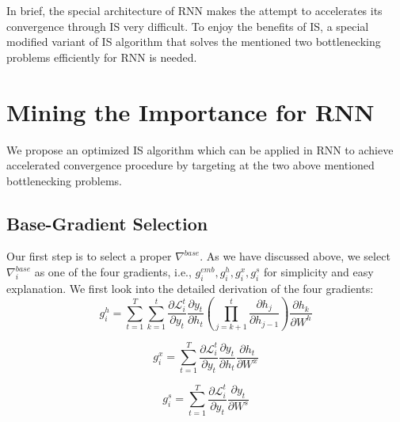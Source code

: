 \documentclass[twoside,leqno,twocolumn]{article}
\begin{document}
In brief, the special architecture of RNN makes the attempt to accelerates its convergence through IS very difficult. To enjoy the benefits of IS, a special modified variant of IS algorithm that solves the mentioned two bottlenecking problems efficiently for RNN is needed.
\section{Mining the Importance for RNN}
We propose an optimized IS algorithm which can be applied in RNN to achieve accelerated convergence procedure by targeting at the two above mentioned bottlenecking problems.
\subsection{Base-Gradient Selection}
Our first step is to select a proper $\nabla^{base}$. As we have discussed above, we select $\nabla^{base}_i$ as one of the four gradients, i.e., $g^{emb}_i,g^{h}_i,g^{x}_i,g^{s}_i$ for simplicity and easy explanation. We first look into the detailed derivation of the four gradients:
\begin{equation}
g_i^h =\sum_{t=1}^{T}\sum_{k=1}^{t}\frac{\partial \mathcal{L}_i^t}{\partial y_{t}}\frac{\partial y_t}{\partial h_{t}}\left(\prod_{j=k+1}^{t}\frac{\partial h_j}{\partial h_{j-1}}\right)\frac{\partial h_k}{\partial W^{h}}
\label{s}
\end{equation}

\begin{equation}
g_i^x=\sum_{t=1}^{T}\frac{\partial \mathcal{L}_i^t}{\partial y_{t}}\frac{\partial y_t}{\partial h_{t}}\frac{\partial h_t}{\partial W^{x}}
\end{equation}

\begin{equation}
g_i^s=\sum_{t=1}^{T}\frac{\partial \mathcal{L}_i^t}{\partial y_{t}}\frac{\partial y_t}{\partial W^{s}}
\end{equation}
\end{document}
